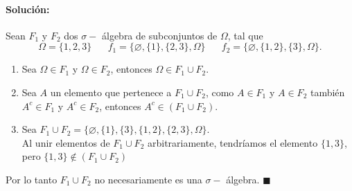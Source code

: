 \documentclass[11pt]{article}
\begin{document}
\paragraph{Solución:}
Sean $F_1$ y $F_2$ dos $\sigma-$ álgebra de subconjuntos de $\Omega$, tal que
$$ \Omega = \{1, 2, 3\} \; \; \; \; \; \;  f_{1} = \{\varnothing, \{1\}, \{2, 3\}, \Omega \} \; \; \; \; \; \; f_{2} = \{\varnothing, \{1, 2\}, \{3\}, \Omega \}.$$
\begin{enumerate}[$i)$]
    \item Sea $\Omega \in F_1$ y $\Omega \in F_2$, entonces $\Omega \in F_1 \cup F_2$.
    \item Sea $A$ un elemento  que pertenece a $F_1 \cup F_2$, como $A\in F_1$ y $A\in F_2$ también $A^c \in F_1$ y $A^c \in F_2$, entonces $A^c \in (F_1 \cup F_2)$.
    \item Sea $F_1 \cup F_2= \{\varnothing, \{1\}, \{3\}, \{1,2\}, \{2,3\}, \Omega \}$.\\
    Al unir elementos de $F_1 \cup F_2$  arbitrariamente, tendríamos el elemento $\{1,3\}$, pero $\{1,3\} \not\in (F_1 \cup F_2)$
\end{enumerate}
Por lo tanto $F_1 \cup F_2$ no necesariamente es una $\sigma-$ álgebra. $\blacksquare$
\end{document}
